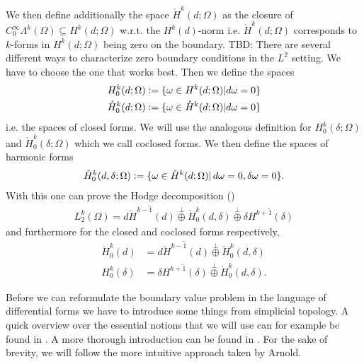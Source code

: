 \documentclass[12pt,a4paper]{article}
\theoremstyle{definition}
\begin{document}
We then define 
additionally the space $\mathring{H}^k(d;\Omega)$ as the closure of 
$C_0^\infty \Lambda^k(\Omega) \subseteq H^k(d;\Omega)$ w.r.t. 
the $H^k(d)$-norm i.e. 
$\mathring{H}^k(d;\Omega)$ corresponds to $k$-forms in $H^k(d;\Omega)$
being zero on the boundary. {\color{red} TBD: There are several different 
ways to characterize zero boundary conditions in the $L^2$ setting. We have
to choose the one that works best.} %
Then we define the spaces 
\begin{align*}
    H^k_0(d;\Omega) &\vcentcolon= \{ \omega \in H^k(d;\Omega) 
    | d\omega = 0 \} \\
    \mathring{H}^k_0(d;\Omega) &\vcentcolon= \{ \omega \in \mathring{H}^k(d;\Omega) 
    | d\omega = 0 \}
\end{align*}
i.e. the spaces of closed forms. We will use the analogous definition for 
$H^k_0(\delta;\Omega)$ and $\mathring{H}^k_0(\delta;\Omega)$ which we call 
coclosed forms. We then define the spaces of harmonic forms
\begin{align*}
    \mathring{H}^k_0(d,\delta;\Omega) \vcentcolon= 
    \{ \omega \in \mathring{H}^k(d;\Omega) 
    | \, d\omega = 0, \delta\omega = 0 \}.
\end{align*}
With this one can prove the Hodge decomposition (\cite[Lemma 1]{arnold})
\begin{align}
    L_2^k(\Omega) = \overline{d\mathring{H}^{k-1}(d)} \stackrel{\perp}{\oplus} 
    \mathring{H}^k_0(d,\delta) \stackrel{\perp}{\oplus} 
    \overline{\delta H^{k+1}(\delta)} \label{hodge_decomposition}
\end{align}
and furthermore for the closed and coclosed forms respectively,
\begin{align}
    \mathring{H}^k_0(d) &= \overline{d\mathring{H}^{k-1}(d)} 
    \stackrel{\perp}{\oplus}
    \mathring{H}^k_0(d,\delta) \label{decomposition_closed_forms} \\
    H^k_0(\delta) &= \overline{\delta H^{k+1}(\delta)} \stackrel{\perp}{\oplus}
    \mathring{H}^k_0(d,\delta). \label{decomposition_coclosed_forms}
\end{align}


Before we can reformulate the boundary value problem in the language of 
differential forms we have to 
introduce some things from simplicial topology. A quick overview over the
essential notions that we will use can for example be found in 
\cite[Chapter 2]{arnold}. A more thorough introduction can be found in 
\cite[Chapter 4]{topology_and_geometry}. For the sake of brevity, we will 
follow the more intuitive approach taken by Arnold.
\end{document}
